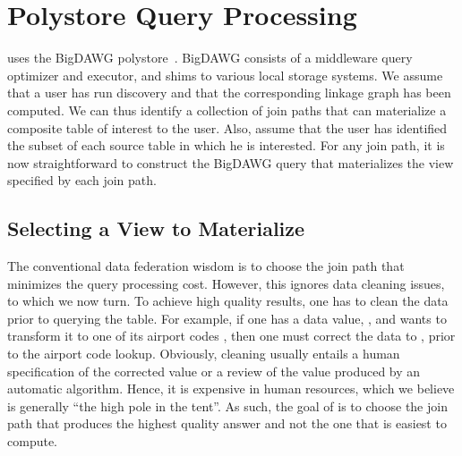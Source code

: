 \section{Polystore Query Processing}
\label{sec:curating}

\dcv uses the BigDAWG polystore~\cite{DBLP:journals/pvldb/ElmoreDSBCGHHKK15}. 
BigDAWG  consists of a middleware query optimizer and executor, and shims to various local storage systems.
We assume that a user has run discovery and that the corresponding linkage graph has been computed. 
We can thus identify a collection of join paths that can materialize a composite table of interest to the user.  
Also, assume that the user has identified the subset of each source table in which he is interested. 
For any join path, it is now straightforward to construct the BigDAWG query that materializes the view specified by each join path. 

\subsection{Selecting a View to Materialize}


The conventional data federation wisdom is to choose the join path that minimizes the query processing cost. However, this ignores data cleaning issues, to which we now turn.
To achieve high quality results, one has to clean the data prior to querying the table. 
For example, if one has a data value, , and wants to transform it to one of its airport codes , then one must correct the data to , prior to the airport code lookup. Obviously, cleaning usually entails a human specification of the corrected value or a review of the value produced by an automatic algorithm. Hence, it is expensive in human resources, which we believe is generally ``the high pole in the tent''. 
As such, the goal of \dcv is to choose the join path that produces the highest quality answer and not the one that is easiest to compute. 

